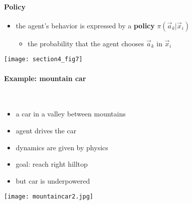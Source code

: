 \paragraph{Policy}
\begin{itemize}
		\item the agent's behavior is expressed by 
			a {\color{policy} \textbf{policy} $\pi(\vec a_k|\vec x_i)$}
			\begin{itemize}
				\item the probability that the agent 
					chooses $\vec a_k$ in $\vec x_i$
			\end{itemize}
	\end{itemize}
	\vspace{2mm}
	\begin{center}
		\texttt{[image: section4\_fig7]}
	\end{center}
	
\paragraph{Example: mountain car}\mbox{}\\
\begin{minipage}{12cm}
		\begin{minipage}{6.5cm}
			\begin{itemize}
				\item a car in a valley between mountains
				\vspace{2mm}
				\item agent drives the car
				\vspace{2mm}
				\item dynamics are given by physics
				\vspace{2mm}
				\item{goal: reach right hilltop
					 }
				\vspace{2mm}
				\item but car is underpowered
			\end{itemize}
		\end{minipage}
		\hfill
		\begin{minipage}{5.5cm}
			\texttt{[image: mountaincar2.jpg]}
		\end{minipage}
	\end{minipage}

